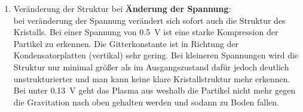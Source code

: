 \documentclass[12pt,a4paper,ngerman]{article}
\begin{document}
\begin{enumerate}[font=\bfseries]
\begin{enumerate}[font=\bfseries, label=\alph*)]
			\item Veränderung der Struktur bei \textbf{Änderung der Spannung}: \\
			bei veränderung der Spannung verändert sich sofort auch die Struktur des Kristalls. Bei einer Spannung von \qty{0,5}{\volt} ist eine starke Kompression der Partikel zu erkennen. Die Gitterkonstante ist in Richtung der Kondensatorplatten (vertikal) sehr gering. Bei kleineren Spannungen wird die Struktur nur minimal größer als im Ausgangszustand dafür jedoch deutlich unstrukturierter und man kann keine klare Kristallstruktur mehr erkennen. Bei unter \qty{0.13}{\volt} geht das Plasma aus weshalb die Partikel nicht mehr gegen die Gravitation nach oben gehalten werden und sodann zu Boden fallen. 
		\end{enumerate}
			
	\end{enumerate}
	
\end{document}
